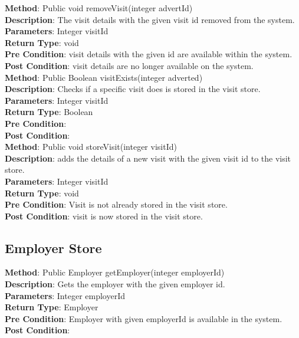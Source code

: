 \documentclass{l3deliverable}
\begin{document}
\textbf{Method}: Public void removeVisit(integer advertId)\\
\textbf{Description}: The visit details with the given visit id removed from the system. \\
\textbf{Parameters}: Integer visitId\\
\textbf{Return Type}: void\\
\textbf{Pre Condition}: visit details with the given id are available within the system.\\
\textbf{Post Condition}: visit details are no longer available on the system.\\

\textbf{Method}: Public Boolean visitExists(integer adverted)\\
\textbf{Description}: Checks if a specific visit does is stored in the visit store. \\
\textbf{Parameters}: Integer visitId\\
\textbf{Return Type}: Boolean\\
\textbf{Pre Condition}:\\
\textbf{Post Condition}:\\

\textbf{Method}: Public void storeVisit(integer visitId) \\
\textbf{Description}:  adds the details of a new visit with the given visit id to the visit store.\\
\textbf{Parameters}: Integer visitId\\
\textbf{Return Type}: void\\
\textbf{Pre Condition}: Visit is not already stored in the visit store.\\
\textbf{Post Condition}: visit is now stored in the visit store.\\

\subsection{Employer Store}

\textbf{Method}: Public Employer getEmployer(integer employerId)\\
\textbf{Description}: Gets the employer with the given employer id.\\
\textbf{Parameters}:  Integer employerId\\
\textbf{Return Type}: Employer\\
\textbf{Pre Condition}: Employer with given employerId is available in the system.\\
\textbf{Post Condition}:\\
\end{document}
